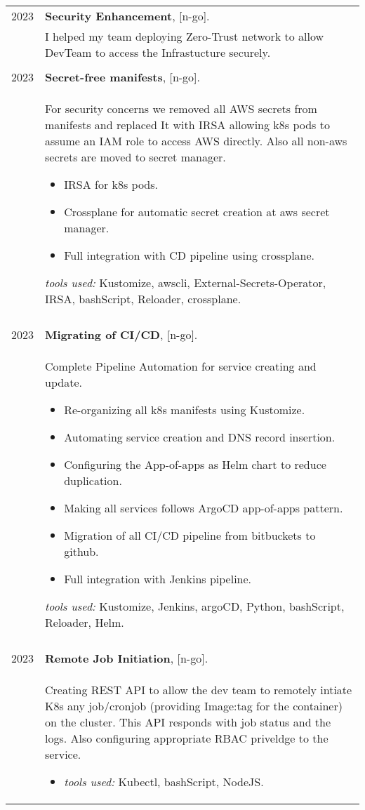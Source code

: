 \documentclass[a4paper,10pt]{article}
\begin{document}
\begin{longtable}{r p{16cm}}
        2023  & \textbf{Security Enhancement}, [n-go].\\&
        I helped my team deploying Zero-Trust network to allow  DevTeam to access the Infrastucture securely. \\
        &\\ 

        2023  & \textbf{Secret-free manifests}, [n-go].\\&
        For security concerns we removed all AWS secrets from manifests and replaced It with IRSA allowing k8s pods to assume an IAM role to access AWS directly. Also all non-aws secrets are moved to secret manager. 
        \begin{itemize}
            \item IRSA for k8s pods.
            \item Crossplane for automatic secret creation at aws secret manager.
            \item Full integration with CD pipeline using crossplane. 
        \end{itemize}
        \textit{tools used: } Kustomize, awscli, External-Secrets-Operator, IRSA, bashScript, Reloader, crossplane.\\
        &\\ 

        2023  & \textbf{Migrating of CI/CD}, [n-go].\\&
        Complete Pipeline Automation for service creating and update.
        \begin{itemize}
            \item Re-organizing all k8s manifests using Kustomize.
            \item Automating service creation and DNS record insertion. 
            \item Configuring the App-of-apps as Helm chart to reduce duplication.
            \item Making all services follows ArgoCD app-of-apps pattern.
            \item Migration of all CI/CD pipeline from bitbuckets to github.
            \item Full integration with Jenkins pipeline. 
        \end{itemize}
        \textit{tools used: } Kustomize, Jenkins, argoCD, Python, bashScript, Reloader, Helm.\\
        &\\ 
        2023  & \textbf{Remote Job Initiation}, [n-go].\\&
        Creating REST API to allow the dev team to remotely intiate K8s any job/cronjob (providing Image:tag for the container) on the cluster. This API responds with job status and the logs. Also configuring appropriate RBAC priveldge to the service.
        \begin{itemize}
            \item \textit{tools used: } Kubectl, bashScript, NodeJS.
        \end{itemize}\\


\end{longtable}
\end{document}
